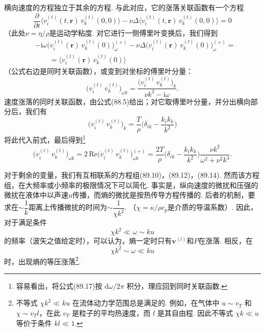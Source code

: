 横向速度的方程独立于其余的方程. 与此对应，它的涨落关联函数有一个方程
\begin{equation}
\frac{\partial}{\partial t}\bigl\langle v^{(t)}_{i}(t,\bm{r})\,v^{(t)}_{k}(0,0)\bigr\rangle-\nu\Delta\bigl\langle v^{(t)}_{i}(t,\bm{r})\,v^{(t)}_{k}(0,0)\bigr\rangle=0
\end{equation}
（此处$\nu=\eta/\rho$是运动学粘度. 对它进行一侧傅里叶变换后，我们得到
\begin{equation*}
\begin{aligned}
&-\mathrm{i}\omega\bigl(v^{(t)}_{i}(\bm{r})\,v^{(t)}_{k}(0)\bigr)^{(+)}_{\omega}-\nu\Delta\bigl(v^{(t)}_{i}(\bm{r})\,v^{(t)}_{k}(0)\bigr)^{(+)}_{\omega}=\\
&\qquad=\bigl\langle v^{(t)}_{i}(\bm{r})\,v^{(t)}_{k}(0)\bigr\rangle
\end{aligned}
\end{equation*}
（公式右边是同时关联函数），或变到对坐标的傅里叶分量：
\begin{equation*}
\bigl(v^{(t)}_{i}\,v^{(t)}_{k}\bigr)_{\omega k}=\frac{\bigl(v^{(t)}_{i}\,v^{(t)}_{k}\bigr)_{k}}{\nu k^{2}-\mathrm{i}\omega}.
\end{equation*}
速度涨落的同时关联函数，由公式(88.5)给出；对它取傅里叶分量，并分出横向部分后，我们有
\begin{equation}
\bigl(v^{(t)}_{i}\,v^{(t)}_{k}\bigr)_{k}=\frac{T}{\rho}\biggl(\delta_{ik}-\frac{k_{i}k_{k}}{k^{2}}\biggr)
\end{equation}
将此代入前式，最后得到\footnote{容易看出，将公式(89.17)按 $\mathrm{d}\omega/2\pi$ 积分，理应回到同时关联函数.}
\begin{equation}
\bigl(v^{(t)}_{i}\,v^{(t)}_{k}\bigr)_{\omega k}=2\,\mathrm{Re}\bigl(v^{(t)}_{i}\,v^{(t)}_{k}\bigr)^{(+)}_{\omega k}=\frac{2T}{\rho}\biggl(\delta_{ik}-\frac{k_{i}k_{k}}{k^{2}}\biggr)\frac{\nu k^{2}}{\omega^{2}+\nu^{2}k^{4}}.
\end{equation}

对于剩余的变量，我们有互相联系的方程组(89.10)，(89.12)，(89.14). 然而该方程组，在大频率或小频率的极限情况下可以简化. 事实是，纵向速度的微扰和压强的微扰在液体中以声速$u$传播，而熵的微扰是按热传导方程传播的. 后者的机制，要求在$\sim\dfrac{1}{k}$距离上传播微扰的时间为$\sim\dfrac{1}{\chi k^{2}}$. （$\chi=\kappa/\rho c_{p}$是介质的导温系数）. 因此，对于满足条件
\begin{equation}
\chi k^{2}\ll\omega\sim ku
\end{equation}
的频率（波矢之值给定时），可以认为，熵一定时只有$\bm{v}^{(l)}$和$P$在涨落. 相反，在
\begin{equation}
\chi k^{2}\sim\omega\ll ku
\end{equation}
时，出现熵的等压涨落\footnote{不等式 $\chi k^{2}\ll ku$ 在流体动力学范围总是满足的. 例如，在气体中 $u\sim v_{T}$ 和 $\chi\sim v_{T}l$，在此 $v_{T}$ 是粒子的平均热速度，而 $l$ 是其自由程. 因此不等式 $\chi k\ll u$ 等价于条件 $kl\ll 1$.}.

